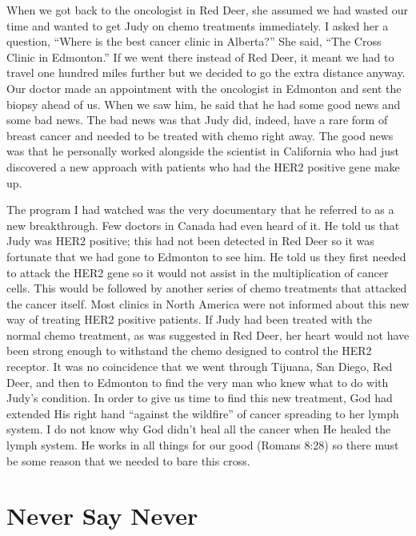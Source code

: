 \documentclass[oneside]{book}
\begin{document}
When we got back to the oncologist in Red Deer, she assumed we had wasted our time and wanted to get Judy on chemo treatments immediately. I asked her a question, “Where is the best cancer clinic in Alberta?” She said, “The Cross Clinic in Edmonton.” If we went there instead of Red Deer, it meant we had to travel one hundred miles further but we decided to go the extra distance anyway. Our doctor made an appointment with the oncologist in Edmonton and sent the biopsy ahead of us. When we saw him, he said that he had some good news and some bad news. The bad news was that Judy did, indeed, have a rare form of breast cancer and needed to be treated with chemo right away. The good news was that he personally worked alongside the scientist in California who had just discovered a new approach with patients who had the HER2 positive gene make up.

The program I had watched was the very documentary that he referred to as a new breakthrough. Few doctors in Canada had even heard of it. He told us that Judy was HER2 positive; this had not been detected in Red Deer so it was fortunate that we had gone to Edmonton to see him. He told us they first needed to attack the HER2 gene so it would not assist in the multiplication of cancer cells. This would be followed by another series of chemo treatments that attacked the cancer itself. Most clinics in North America were not informed about this new way of treating HER2 positive patients. If Judy had been treated with the normal chemo treatment, as was suggested in Red Deer, her heart would not have been strong enough to withstand the chemo designed to control the HER2 receptor. It was no coincidence that we went through Tijuana, San Diego, Red Deer, and then to Edmonton to find the very man who knew what to do with Judy’s condition. In order to give us time to find this new treatment, God had extended His right hand “against the wildfire” of cancer spreading to her lymph system. I do not know why God didn’t heal all the cancer when He healed the lymph system. He works in all things for our good (Romans 8:28) so there must be some reason that we needed to bare this cross.


\section{Never Say Never}
\
\end{document}
